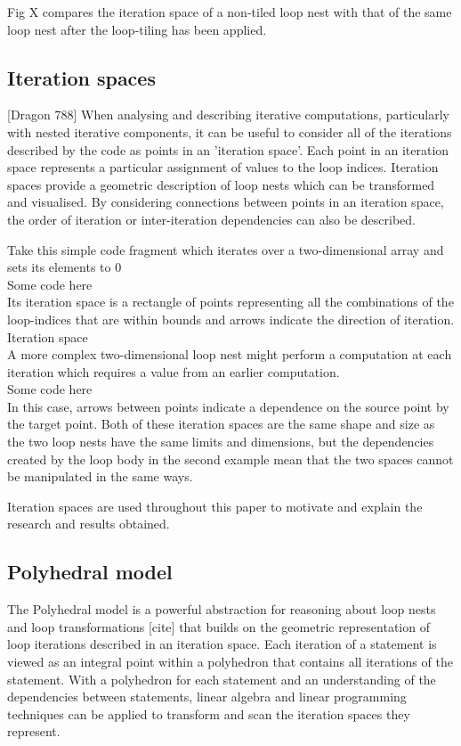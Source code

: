 \documentclass[a4paper,12pt,twoside]{report}
\begin{document}
Fig X compares the iteration space of a non-tiled loop nest with that of the same loop nest after the loop-tiling has been applied.

\subsection*{Iteration spaces}
[Dragon 788]
When analysing and describing iterative computations, particularly with nested iterative components, it can be useful to consider 
all of the iterations described by the code as points in an 'iteration space'. Each point in an iteration space represents a
particular assignment of values to the loop indices. Iteration spaces provide a geometric description of loop nests which can be
transformed and visualised. By considering connections between points in an iteration space, the order of iteration or 
inter-iteration dependencies can also be described.

Take this simple code fragment which iterates over a two-dimensional array and sets its elements to 0
\\ Some code here \\
Its iteration space is a rectangle of points representing all the combinations of the loop-indices that are within bounds and
arrows indicate the direction of iteration.
\\ Iteration space \\

A more complex two-dimensional loop nest might perform a computation at each iteration which requires a value from an earlier
computation.
\\ Some code here \\
In this case, arrows between points indicate a dependence on the source point by the target point. Both of these iteration 
spaces are the same shape and size as the two loop nests have the same limits and dimensions, but the
dependencies created by the loop body in the second example mean that the two spaces cannot be manipulated in the same ways.

Iteration spaces are used throughout this paper to motivate and explain the research and results obtained.

\subsection*{Polyhedral model}
The Polyhedral model is a powerful abstraction for reasoning about loop nests and loop transformations [cite] that builds on the
geometric representation of loop iterations described in an iteration space. Each iteration of a statement is viewed as an
integral point within a polyhedron that contains all iterations of the statement. With a polyhedron for each statement and an understanding
of the dependencies between statements, linear algebra and linear programming techniques can be applied to transform and scan
the iteration spaces they represent.
\end{document}
